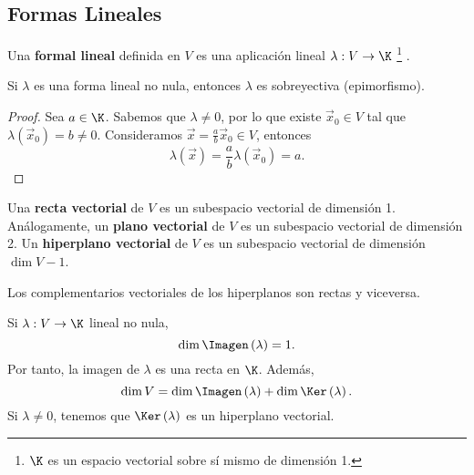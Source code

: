 \subsection{Formas Lineales}

\begin{fdefinition}
\normalfont Una \textbf{formal lineal} definida en $\displaystyle V $ es una aplicación lineal $\displaystyle \lambda : V \to \K $ \footnote{ $\displaystyle \K $ es un espacio vectorial sobre sí mismo de dimensión 1.} .
\end{fdefinition}

\begin{ftheorem}[]
\normalfont  Si $\displaystyle \lambda $ es una forma lineal no nula, entonces $\displaystyle \lambda $ es sobreyectiva (epimorfismo).  
\end{ftheorem}

\begin{proof}
Sea $\displaystyle a \in \K $. Sabemos que $\displaystyle \lambda \neq 0 $, por lo que existe $\displaystyle \vec{x}_{0} \in V $ tal que $\displaystyle \lambda\left(\vec{x}_{0}\right) = b \neq 0 $. Consideramos $\displaystyle \vec{x} = \frac{a}{b}\vec{x}_{0} \in V $, entonces
\[\lambda\left(\vec{x}\right) = \frac{a}{b}\lambda\left(\vec{x}_{0}\right) = a .\]
\end{proof}

\begin{fdefinition}[]
\normalfont Una \textbf{recta vectorial}  de $\displaystyle V $ es un subespacio vectorial de dimensión 1. Análogamente, un \textbf{plano vectorial}  de $\displaystyle V $ es un subespacio vectorial de dimensión 2. Un \textbf{hiperplano vectorial} de $\displaystyle V $ es un subespacio vectorial de dimensión $\displaystyle \dim V -1 $.
\end{fdefinition}

\begin{observation}
\normalfont Los complementarios vectoriales de los hiperplanos son rectas y viceversa.
\end{observation}

Si $\displaystyle \lambda : V \to \K $ lineal no nula, 
\[\dim \Imagen\left(\lambda\right) = 1 .\]
Por tanto, la imagen de $\displaystyle \lambda $ es una recta en $\displaystyle \K $. Además, 
\[\dim V = \dim \Imagen\left(\lambda\right) + \dim \Ker\left(\lambda\right) .\]
Si $\displaystyle \lambda \neq 0 $, tenemos que $\displaystyle \Ker\left(\lambda\right) $  es un hiperplano vectorial. 

